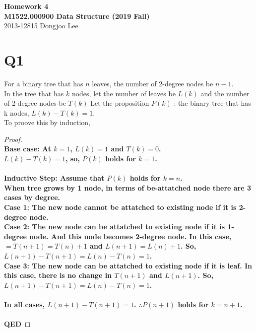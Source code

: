 \documentclass[12pt,a4paper]{article}
\begin{document}
    \begin{center}
        {\bf\large Homework 4} \\
        {\bf\large M1522.000900 Data Structure (2019 Fall)} \\
        2013-12815 Dongjoo Lee \\
    \end{center}

    \section{Q1}
    For a binary tree that has $n$ leaves,
    the number of 2-degree nodes be $n-1$.\\
    In the tree that has $k$ nodes, 
    let the number of leaves be $L(k)$ and
    the number of 2-degree nodes be $T(k)$ 
    Let the proposition $P(k)$ : the binary tree that has k nodes, $L(k)-T(k)=1$.
    \\ To proove this by induction,
    \begin{proof}
        \\ \bf{Base case: } At $k=1$, $L(k)=1$ and $T(k)=0$.
        \\ $L(k)-T(k)=1$, so, $P(k)$ holds for $k=1$.
        \\
        \\ \bf{Inductive Step: } Assume that $P(k)$ holds for $k=n$.
        \\ When tree grows by 1 node, in terms of be-attatched node there are 3 cases by degree.
        \\ \bf{Case 1: } The new node cannot be attatched to existing node if it is 2-degree node.
        \\ \bf{Case 2: } The new node can be attatched to existing node if it is 1-degree node. 
        And this node becomes 2-degree node. 
        In this case, $=T(n+1)=T(n)+1$ and $L(n+1)=L(n)+1$.
        So, $L(n+1)-T(n+1)=L(n)-T(n)=1$.
        \\ \bf{Case 3: } The new node can be attatched to existing node if it is leaf.
        In this case, there is no change in $T(n+1)$ and $L(n+1)$.
        So, $L(n+1)-T(n+1)=L(n)-T(n)=1$.
        \\
        \\In all cases, $L(n+1)-T(n+1)=1$.
        $\therefore P(n+1)$ holds for $k=n+1$.
        \\
        \\ \bf{QED}
    \end{proof}
\end{document}
